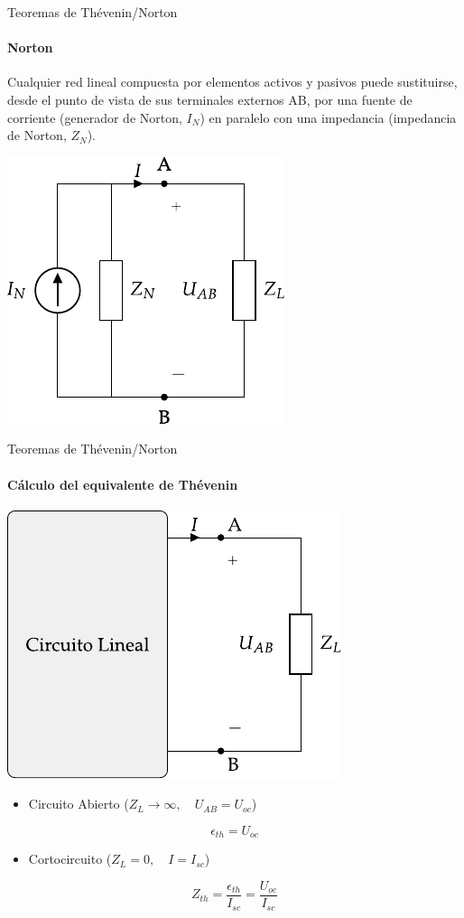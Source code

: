 \documentclass[aspectratio=169, usenames,svgnames,dvipsnames]{beamer}
\begin{document}
\begin{frame}[label={sec:orgca38193}]{Teoremas de Thévenin/Norton}
\framesubtitle{Norton}
Cualquier \alert{red lineal} compuesta por elementos activos y pasivos puede sustituirse, desde el punto de vista de sus terminales externos AB, por una \alert{fuente de corriente} (generador de Norton, \(I_N\)) en \alert{paralelo} con una impedancia (impedancia de Norton, \(Z_N\)).

\begin{center}
\includegraphics[height=0.6\textheight]{../figs/EquivalenteNorton.pdf}
\end{center}
\end{frame}

\begin{frame}[label={sec:org5929b87}]{Teoremas de Thévenin/Norton}
\framesubtitle{Cálculo del equivalente de Thévenin}
\begin{center}
\includegraphics[height=0.38\textheight]{../figs/EquivalenteThevenin.pdf}
\end{center}

\begin{itemize}
\item Circuito Abierto (\(Z_L \to \infty, \quad U_{AB} = U_{oc}\))
\end{itemize}
\[
\boxed{\epsilon_{th} = U_{oc}}
\]
\begin{itemize}
\item Cortocircuito (\(Z_L = 0, \quad I = I_{sc}\))
\end{itemize}
\[
\boxed{Z_{th} = \frac{\epsilon_{th}}{I_{sc}} = \frac{U_{oc}}{I_{sc}}}
\]
\end{frame}
\end{document}
